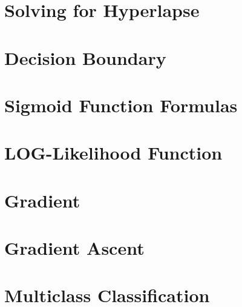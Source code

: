 \documentclass[12pt, a4paper]{article}
\begin{document}
\section*{Solving for Hyperlapse}

\section*{Decision Boundary}

\section*{Sigmoid Function Formulas}

\section*{LOG-Likelihood Function}

\section*{Gradient}

\section*{Gradient Ascent}

\section*{Multiclass Classification}
\end{document}
